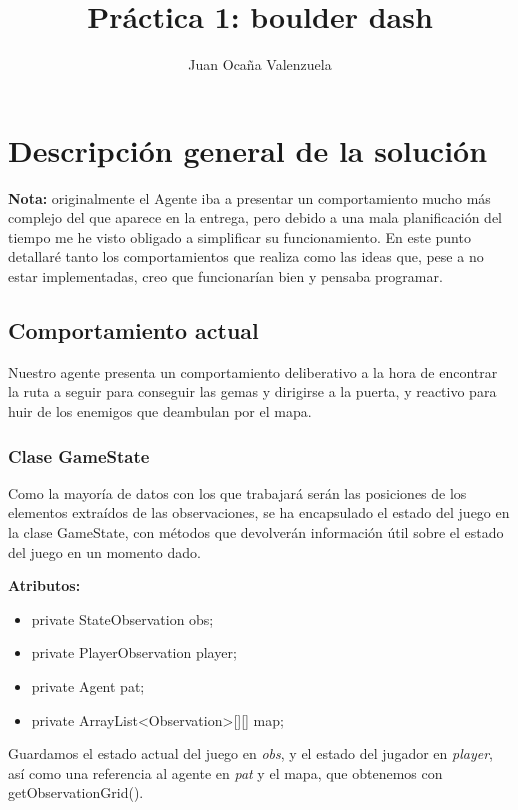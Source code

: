\documentclass[11pt,a4paper]{article}
\author{	Juan Ocaña Valenzuela}
\title{\textbf{Práctica 1: boulder dash}}
\begin{document}
\thispagestyle{empty}

\maketitle

\newpage

\tableofcontents

\newpage

\section{Descripción general de la solución}

\textbf{Nota:} originalmente el Agente iba a presentar un comportamiento mucho más complejo del que aparece
en la entrega, pero debido a una mala planificación del tiempo me he visto obligado a simplificar su 
funcionamiento. En este punto detallaré tanto los comportamientos que realiza como las ideas que, pese a no estar implementadas,
creo que funcionarían bien y pensaba programar.

\subsection{Comportamiento actual}
Nuestro agente presenta un comportamiento deliberativo a la hora de encontrar la ruta a seguir para conseguir las gemas y 
dirigirse a la puerta, y reactivo para huir de los enemigos que deambulan por el mapa.

\subsubsection{Clase GameState}
Como la mayoría de datos con los que trabajará serán las posiciones de los elementos extraídos de las observaciones, se ha 
encapsulado el estado del juego en la clase GameState, con métodos que devolverán información útil sobre el estado del juego en
un momento dado. 

\textbf{Atributos:}
\begin{itemize}
\item   private StateObservation obs;
\item   private PlayerObservation player;
\item   private Agent pat;
\item   private ArrayList<Observation>[][] map;
\end{itemize}

Guardamos el estado actual del juego en \textit{obs}, y el estado del jugador en \textit{player}, así como una referencia al 
agente en \textit{pat} y el mapa, que obtenemos con getObservationGrid().
\end{document}
